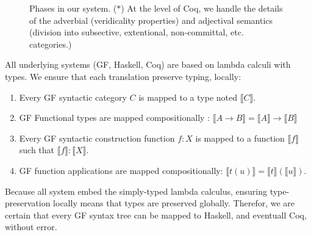 \documentclass{article}
\begin{document}
\begin{figure}
  \centering
{
  \tiny
{}
}
\caption{Phases in our system. ($\ast$) At the level of Coq, we handle
  the details of the adverbial (veridicality properties) and
  adjectival semantics (division into subsective, extentional,
  non-committal, etc. categories.) }
  \label{fig:overview}
\end{figure}

All underlying systems (GF, Haskell, Coq) are based on lambda calculi
with types. We ensure that each translation preserve typing, locally:
\begin{enumerate}
\item Every GF syntactic category $C$ is mapped to a type noted $⟦C⟧$.
\item GF Functional types are mapped compositionally : $⟦A → B⟧ = ⟦A⟧ → ⟦B⟧$
\item Every GF syntactic construction function $f : X$ is mapped to a function $⟦f⟧$ such that $⟦f⟧ : ⟦X⟧$.
\item GF function applications are mapped compositionally: $⟦t(u)⟧ = ⟦t⟧ (⟦u⟧)$.
\end{enumerate}
Because all system embed the simply-typed lambda calculus, ensuring
type-preservation locally means that types are preserved globally.
Therefor, we are certain that every GF syntax tree can be mapped to
Haskell, and eventuall Coq, without error.
\end{document}
